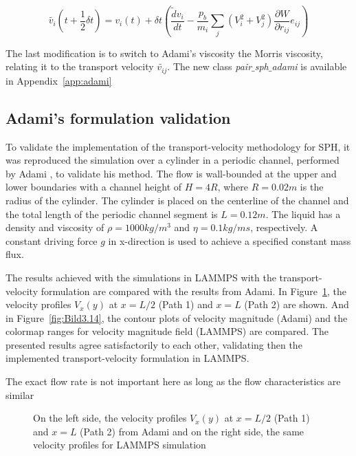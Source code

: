\begin{equation}
\tilde {v_{i}}(t+\frac{1}{2}\delta t) = v_{i}(t) + \delta t \left( \frac{\tilde {d}v_{i}}{dt} - \frac{p_{b}}{m_{i}} \sum_{j} (V^2_{i} + V^2_{j}) \frac {\partial W}{\partial r_{ij}}e_{ij}\right)
\end{equation}

The last modification is to switch to Adami's viscosity the Morris viscosity, relating it to the transport velocity $\tilde {v_{ij}}$. The new class \textit{pair$\_$sph$\_$adami}
is available in Appendix~\ref{app:adami}

\subsection{Adami's formulation validation}
\label{sec:section 1}

To validate the implementation of the transport-velocity methodology for SPH, it was reproduced the simulation over a cylinder in a periodic channel, performed by Adami
\cite{adami_transport-velocity_2013}, to validate his method. The flow is wall-bounded at the upper and lower boundaries with a channel height of $H=4R$, where $R=0.02m$ is the 
radius of the cylinder. The cylinder is placed on the centerline of the channel and the total length of the periodic channel segment is $L=0.12m$. The liquid has a density and
viscosity of $\rho = 1000 kg/m^3$ and $\eta = 0.1 kg/ms$, respectively. A constant driving force $g$ in x-direction is used to achieve a specified constant mass flux.\par
The results achieved with the simulations in LAMMPS with the transport-velocity formulation are compared with the results from Adami. In Figure~\ref{fig:Bild3.13}, the velocity profiles
$V_{x}(y)$ at $x = L/2$ (Path 1) and $x=L$ (Path 2) are shown. And in Figure~\ref{fig:Bild3.14}, the contour plots of velocity magnitude (Adami) and the colormap ranges for velocity magnitude field (LAMMPS)
are  compared. The presented results agree satisfactorily to each other, validating then the implemented transport-velocity formulation in LAMMPS.

The exact flow rate is not important here as long as the flow characteristics are similar

\begin{figure}[H]
\centering
  \begin{footnotesize}
  
  \caption[On the left side, the velocity profiles $V_{x}(y)$ at $x = L/2$ (Path 1) and $x=L$ (Path 2) from Adami \cite{adami_transport-velocity_2013} and on the right side,
  the same velocity profiles for LAMMPS simulation]{On the left side, the velocity profiles $V_{x}(y)$ at $x = L/2$ (Path 1) and $x=L$ (Path 2) from Adami \cite{adami_transport-velocity_2013} and on the right side,
  the same velocity profiles for LAMMPS simulation}
  \label{fig:Bild3.13}
  \end{footnotesize}
\end{figure} 



